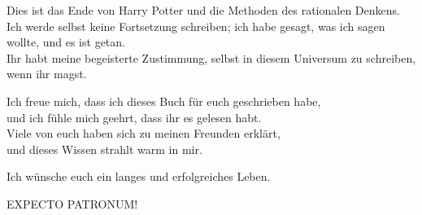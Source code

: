 \begin{chapterOpeningAuthorNote}
Dies ist das Ende von Harry Potter und die Methoden des rationalen Denkens.
Ich werde selbst keine Fortsetzung schreiben; ich habe gesagt, was ich sagen wollte, und es ist getan.\\
Ihr habt meine begeisterte Zustimmung, selbst in diesem Universum zu schreiben, wenn ihr magst.




Ich freue mich, dass ich dieses Buch für euch geschrieben habe,\\
und ich fühle mich geehrt, dass ihr es gelesen habt.\\
Viele von euch haben sich zu meinen Freunden erklärt, \\
und dieses Wissen strahlt warm in mir.

Ich wünsche euch ein langes und erfolgreiches Leben.
\end{chapterOpeningAuthorNote}
\begin{chapterOpeningQuote}
EXPECTO PATRONUM!
\end{chapterOpeningQuote}

